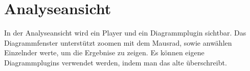\chapter{Analyseansicht}
In der Analyseansicht  wird ein Player und ein Diagrammplugin sichtbar. Das Diagrammfenster unterstützt zoomen mit dem Mausrad, sowie anwählen Einzelnder werte, um die Ergebnise zu zeigen.
Es können eigene Diagrammplugins verwendet werden, indem man das alte überschreibt.